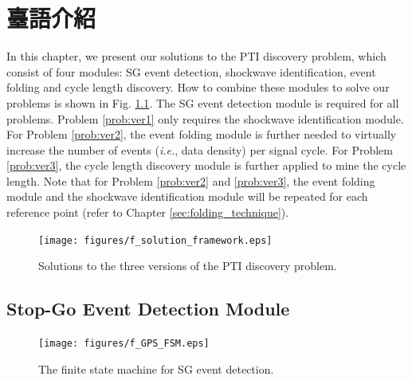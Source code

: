 \documentclass[final,oneside,onecolumn,12pt,a4paper]{book}%
\begin{document}
\chapter{臺語介紹}

\label{cha:solutions}

In this chapter, we present our solutions to the PTI discovery problem, which
consist of four modules: SG event detection, shockwave identification, event
folding and cycle length discovery. How to combine these modules to solve our
problems is shown in Fig. \ref{fig:f_solution_framework}. The SG event
detection module is required for all problems. Problem \ref{prob:ver1} only
requires the shockwave identification module. For Problem \ref{prob:ver2}, the
event folding module is further needed to virtually increase the number of
events (\textit{i.e.}, data density) per signal cycle. For Problem
\ref{prob:ver3}, the cycle length discovery module is further applied to mine
the cycle length. Note that for Problem \ref{prob:ver2} and \ref{prob:ver3},
the event folding module and the shockwave identification module will be
repeated for each reference point (refer to Chapter
\ref{sec:folding_technique}).\begin{figure}[pth]
\centerline{\texttt{[image: figures/f\_solution\_framework.eps]}} \hfill\caption{Solutions to the three
versions of the PTI discovery problem.}%
\label{fig:f_solution_framework}%
\end{figure}

\section{Stop-Go Event Detection Module}

\bigskip

\label{sec:detect_SG_events}

\begin{figure}[pth]
\centerline{\texttt{[image: figures/f\_GPS\_FSM.eps]}} \hfill\caption{The finite state machine for SG event
detection.}%
\label{fig:f_GPS_FSM}%
\end{figure}
\end{document}
